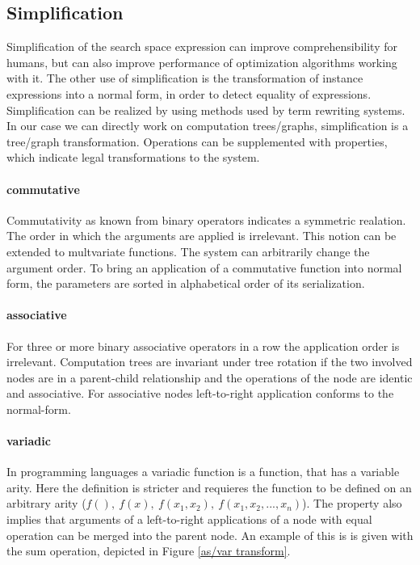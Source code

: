 \documentclass[english]{article}
\begin{document}
\subsection{Simplification}
Simplification of the search space expression can improve comprehensibility for humans, but can also improve performance of optimization algorithms working with it. The other use of simplification is the transformation of instance expressions into a normal form, in order to detect equality of expressions.
Simplification can be realized by using methods used by term rewriting systems. In our case we can directly work on computation trees/graphs,  simplification is a tree/graph transformation. Operations can be supplemented with properties, which indicate legal transformations to the system.

\paragraph{commutative} Commutativity as known from binary operators indicates a symmetric realation. The order in which the arguments are applied is irrelevant. This notion can be extended to multvariate functions. The system can arbitrarily change the argument order. To bring an application of a commutative function into normal form, the parameters are sorted in alphabetical order of its serialization.

\paragraph{associative} For three or more binary associative operators in a row the application order is irrelevant. Computation trees are invariant under tree rotation if the two involved nodes are in a parent-child relationship and the operations of the node are identic and associative. For associative nodes left-to-right application conforms to the normal-form.

\paragraph{variadic}
In programming languages a variadic function is a function, that has a variable arity. Here the definition is stricter and requieres the function to be defined on an arbitrary arity ($f(),\ f(x),\ f(x_1,x_2),\ f(x_1,x_2,...,x_n)$).  The property also implies that arguments of a left-to-right applications of a node with equal operation can be merged into the parent node. An example of this is is given with the sum operation, depicted in Figure \ref{as/var transform}.
\end{document}
